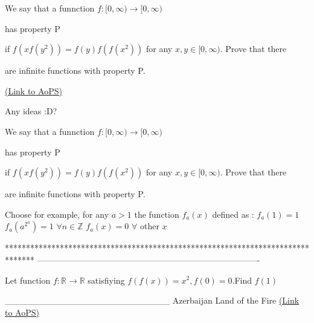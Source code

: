 \begin{problem}
	We say that a funnction $f:[0,\infty)\to[0,\infty)$ \begin{bolded}has property P\end{bolded} if $f(xf(y^2))=f(y) f(f(x^2)) $ for any $x,y\in[0,\infty)$. Prove that there \begin{bolded}are infinite functions with property P.\end{bolded}
	\flushright \href{https://artofproblemsolving.com/community/c6h457586}{(Link to AoPS)}
\end{problem}



\begin{solution}
	Any ideas :D?
\end{solution}



\begin{solution}
	\begin{tcolorbox}We say that a funnction $f:[0,\infty)\to[0,\infty)$ \begin{bolded}has property P\end{bolded} if $f(xf(y^2))=f(y) f(f(x^2)) $ for any $x,y\in[0,\infty)$. Prove that there \begin{bolded}are infinite functions with property P.\end{bolded}\end{tcolorbox}
Choose for example, for any $a>1$ the function $f_a(x)$ defined as :
$f_a(1)=1$
$f_a(a^{2^n})=1$ $\forall n\in\mathbb Z$
$f_a(x)=0$ $\forall$ other $x$
\end{solution}
*******************************************************************************
-------------------------------------------------------------------------------

\begin{problem}
	Let function $f: \mathbb{R}\to\mathbb{R}$ satisfiying $f(f(x))=x^2,
f(0)=0$.Find $f(1)$


__________________________
Azerbaijan Land of the Fire  
	\flushright \href{https://artofproblemsolving.com/community/c6h458557}{(Link to AoPS)}
\end{problem}



